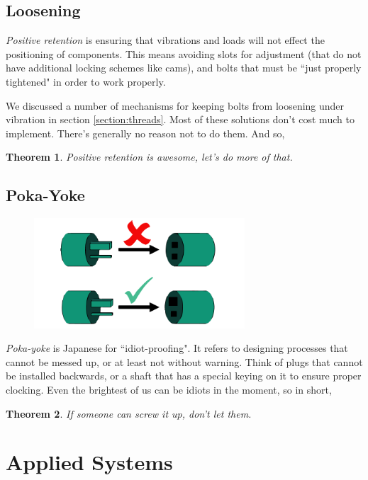 \documentclass[10pt,letterpaper]{book}
\newtheorem{theorem}{Theorem}
\begin{document}
\section{Loosening}

\par{\textit{Positive retention} is ensuring that vibrations and loads will not effect the positioning of components. This means avoiding slots for adjustment (that do not have additional locking schemes like cams), and bolts that must be ``just properly tightened" in order to work properly.

We discussed a number of mechanisms for keeping bolts from loosening under vibration in section \ref{section:threads}. Most of these solutions don't cost much to implement. There's generally no reason not to do them. And so,

\begin{theorem}
Positive retention is awesome, let's do more of that.
\end{theorem}}

\section{Poka-Yoke}

\begin{figure}[H]
	\includegraphics[width=0.7\textwidth]{imgs/poka_yoke.png}
\end{figure}

\textit{Poka-yoke} is Japanese for ``idiot-proofing". It refers to designing processes that cannot be messed up, or at least not without warning. Think of plugs that cannot be installed backwards, or a shaft that has a special keying on it to ensure proper clocking. Even the brightest of us can be idiots in the moment, so in short,

\begin{theorem}
If someone can screw it up, don't let them.
\end{theorem}

\chapter{Applied Systems}
\end{document}
